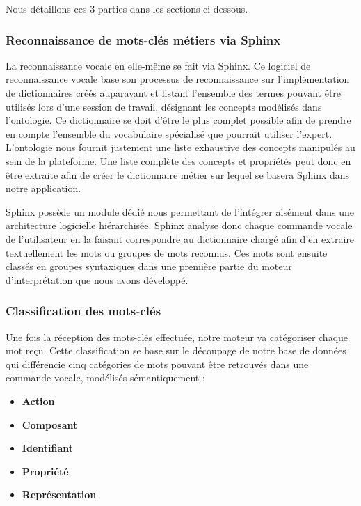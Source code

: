 Nous détaillons ces 3 parties dans les sections ci-dessous.

\subsubsection{Reconnaissance de mots-clés métiers via Sphinx} \label{Sphinx}

La reconnaissance vocale en elle-même se fait via Sphinx. Ce logiciel de reconnaissance vocale base son processus de reconnaissance sur l'implémentation de dictionnaires créés auparavant et listant l'ensemble des termes pouvant être utilisés lors d'une session de travail, désignant les concepts modélisés dans l'ontologie. 
Ce dictionnaire se doit d'être le plus complet possible afin de prendre en compte l'ensemble du vocabulaire spécialisé que pourrait utiliser l'expert. L'ontologie nous fournit justement une liste exhaustive des concepts manipulés au sein de la plateforme. Une liste complète des concepts et propriétés peut donc en être extraite afin de créer le dictionnaire métier sur lequel se basera Sphinx dans notre application.

Sphinx possède un module dédié nous permettant de l'intégrer aisément dans une architecture logicielle hiérarchisée. Sphinx analyse donc chaque commande vocale de l'utilisateur en la faisant correspondre au dictionnaire chargé afin d'en extraire textuellement les mots ou groupes de mots reconnus. Ces mots sont ensuite classés en groupes syntaxiques dans une première partie du moteur d'interprétation que nous avons développé.

\subsubsection{Classification des mots-clés} \label{classification_keywords}

Une fois la réception des mots-clés effectuée, notre moteur va  catégoriser chaque mot reçu. Cette classification se base sur le découpage de notre base de données qui différencie cinq catégories de mots pouvant être retrouvés dans une commande vocale,  modélisés sémantiquement  :

\begin{itemize}
	\item \textbf{Action}
	\item \textbf{Composant}
	\item \textbf{Identifiant}
	\item \textbf{Propriété}
	\item \textbf{Représentation}
\end{itemize}

